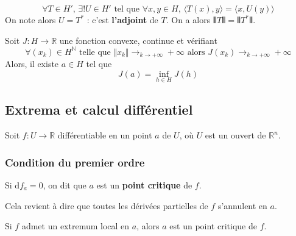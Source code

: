   \begin{corollary}
    \[ \forall T \in H', \, \exists! U \in H' \text{ tel que } \forall x, y \in H, \, \langle T(x), y \rangle = \langle x, U(y) \rangle \]
    On note alors $U = T^*$ : c'est \textbf{l'adjoint} de $T$. On a alors $\VERT T \VERT = \VERT T^* \VERT$.
  \end{corollary}
  
  
  \begin{application}
    Soit $J : H \rightarrow \mathbb{R}$ une fonction convexe, continue et vérifiant
    \[ \forall (x_k) \in H^{\mathbb{N}} \text{ telle que } \Vert x_k \Vert \longrightarrow_{k \rightarrow +\infty} +\infty \text{ alors } J(x_k) \longrightarrow_{k \rightarrow +\infty} +\infty \]
    Alors, il existe $a \in H$ tel que
    \[ J(a) = \inf_{h \in H} J(h) \]
  \end{application}

  \subsection{Extrema et calcul différentiel}

  Soit $f : U \rightarrow \mathbb{R}$ différentiable en un point $a$ de $U$, où $U$ est un ouvert de $\mathbb{R}^n$.

  \subsubsection{Condition du premier ordre}


  \begin{definition}
    Si $\mathrm{d}f_a = 0$, on dit que $a$ est un \textbf{point critique} de $f$.
  \end{definition}

  \begin{remark}
    Cela revient à dire que toutes les dérivées partielles de $f$ s'annulent en $a$.
  \end{remark}

  \begin{proposition}
    Si $f$ admet un extremum local en $a$, alors $a$ est un point critique de $f$.
  \end{proposition}

